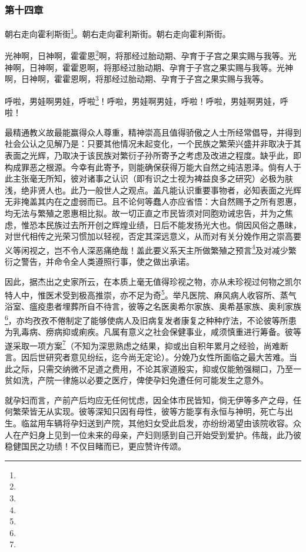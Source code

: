\subsubsection*{第十四章}

\par 朝右走向霍利斯街\footnote{}。朝右走向霍利斯街。朝右走向霍利斯街。
\par 光神啊，日神啊，霍霍恩\footnote{}啊，将那经过胎动期、孕育于子宫之果实赐与我等。光神啊，日神啊，霍霍恩啊，将那经过胎动期、孕育于子宫之果实赐与我等。光神啊，日神啊，霍霍恩啊，将那经过胎动期、孕育于子宫之果实赐与我等。
\par 呼啦，男娃啊男娃，呼啦\footnote{}！呼啦，男娃啊男娃，呼啦！呼啦，男娃啊男娃，呼啦！
\par 最精通教义故最能赢得众人尊重，精神崇高且值得骄傲之人士所经常倡导，并得到社会公认之见解乃是：只要其他情况未起变化，一个民族之繁荣兴盛并非取决于其表面之光辉，乃取决于该民族对繁衍子孙所寄予之考虑及改进之程度。缺乎此，即构成罪恶之根源。今幸有此寄予，则能确保获得万能大自然之纯洁恩泽。倘有人于此主张毫无所知，彼对诸事之认识（即有识之士视为裨益良多之研究）必极为肤浅，绝非贤人也。此乃一般世人之观点。盖凡能认识重要事物者，必知表面之光辉无非掩盖其内在之虚弱而已。且不论何等蠢人亦应省悟：大自然赐予之所有恩惠，均无法与繁殖之恩惠相比拟。故一切正直之市民皆须对同胞劝诫忠告，并为之焦虑，惟恐本民族过去所开创之辉煌业绩，日后不能发扬光大也。倘因风俗之愚昧，对世代相传之光荣习惯加以轻视，否定其深远意义，从而对有关分娩作用之崇高要义等闲视之，岂不令人深恶痛绝哉！盖此要义系天主所做繁殖之预言\footnote{}及对减少繁衍之警告，并命令全人类遵照行事，使之做出承诺。
\par 因此，据杰出之史家所云，在本质上毫无值得珍视之物，亦从未珍视过何物之凯尔特人中，惟医术受到极高推崇，亦不足为奇\footnote{}。举凡医院、麻风病人收容所、蒸气浴室、瘟疫患者埋葬所自不待言，彼等之名医奥希尔家族、奥希基家族、奥利家族\footnote{}，亦均孜孜不倦制定了能够使病人及旧病复发者康复之种种疗法，不论彼等所患为乳毒病、痨病抑或痢疾。凡属有意义之社会保健事业，咸须慎重进行筹备。彼等遂采取一项方案\footnote{}（不知为深思熟虑之结果，抑或出自积年累月之经验，尚难断言。因后世研究者意见纷纭，迄今尚无定论）。分娩乃女性所面临之最大苦难。当此之际，只需交纳微不足道之费用，不论其家道殷实，抑或仅能勉强糊口，乃至一贫如洗，产院一律施以必要之医疗，俾使孕妇免遭任何可能发生之意外。
\par 就孕妇而言，产前产后均应无任何忧虑，因全体市民皆知，倘无伊等多产之母，任何繁荣皆无从实现。彼等深知只因有母性，彼等方能享有永恒与神明，死亡与出生。临盆用车辆将孕妇送到产院，其他妇女受此启发，亦纷纷渴望由该院收容。众人在产妇身上见到一位未来的母亲，产妇则感到自己开始受到爱护。伟哉，此乃彼稳健国民之功绩！不仅目睹而已，更应赞许传颂。
